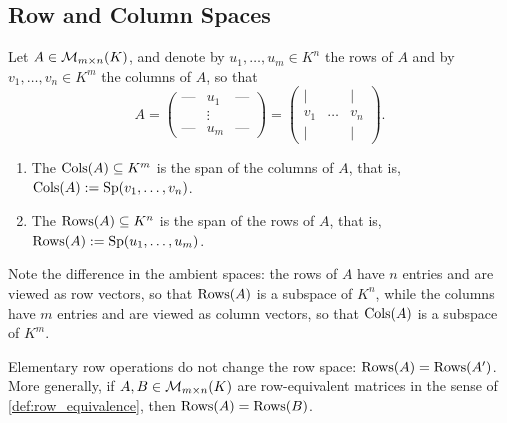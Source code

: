 \subsection{Row and Column Spaces}

\begin{definition}
\label{def:matrix_subspaces}
Let $A \in \mathcal{M}_{m \times n}(K)$, and denote by $u_{1}, \dots, u_{m} \in K^{n}$ the rows of $A$ and by $v_{1}, \dots, v_{n} \in K^{m}$ the columns of $A$, so that
\[
A = \begin{pmatrix} \text{---} & u_{1} & \text{---} \\ & \vdots & \\ \text{---} & u_{m} & \text{---} \end{pmatrix} = \begin{pmatrix} | & & | \\ v_{1} & \dots & v_{n} \\ | & & | \end{pmatrix}.
\]
\begin{enumerate}
\item The  $\operatorname{Cols}(A) \subseteq K^{m}$ is the span of the columns of $A$, that is, $\operatorname{Cols}(A) := \operatorname{Sp}(v_{1}, \dots, v_{n})$.
\item The  $\operatorname{Rows}(A) \subseteq K^{n}$ is the span of the rows of $A$, that is, $\operatorname{Rows}(A) := \operatorname{Sp}(u_{1}, \dots, u_{m})$.
\end{enumerate}
\end{definition}

Note the difference in the ambient spaces: the rows of $A$ have $n$ entries and are viewed as row vectors, so that $\operatorname{Rows}(A)$ is a subspace of $K^{n}$, while the columns have $m$ entries and are viewed as column vectors, so that $\operatorname{Cols}(A)$ is a subspace of $K^{m}$.

\begin{proposition}
\label{prop:row_space_invariance}
Elementary row operations do not change the row space: $\operatorname{Rows}(A) = \operatorname{Rows}(A')$. More generally, if $A, B \in \mathcal{M}_{m \times n}(K)$ are row-equivalent matrices in the sense of \cref{def:row_equivalence}, then $\operatorname{Rows}(A) = \operatorname{Rows}(B)$.
\end{proposition}

